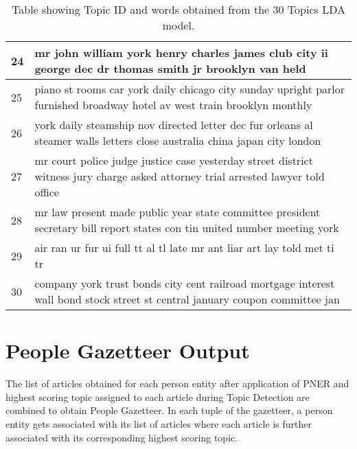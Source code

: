 \begin{table}
{\begin{tabular}{|p{1cm}|p{16cm}|}
    24       & mr john william york henry charles james club city ii george dec dr thomas smith jr brooklyn van held                                                 \\ \hline
    25       & piano st rooms car york daily chicago city sunday upright parlor furnished broadway hotel av west train brooklyn monthly                              \\ \hline
    26       & york daily steamship nov directed letter dec fur orleans al steamer walls letters close australia china japan city london                             \\ \hline
    27       & mr court police judge justice case yesterday street district witness jury charge asked attorney trial arrested lawyer told office                     \\ \hline
    28       & mr law present made public year state committee president secretary bill report states con tin united number meeting york                             \\ \hline
    29       & air ran ur fur ui full tt al tl late mr ant liar art lay told met ti tr                                                                               \\ \hline
    30       & company york trust bonds city cent railroad mortgage interest wall bond stock street st central january coupon committee jan                          \\ \hline
    \end{tabular}}
\caption{Table showing Topic ID and words obtained from the 30 Topics LDA model.}
\label{table:topicwords}
\end{table}

\newpage
\section{People Gazetteer Output }
\label{gaz:result}

The list of articles obtained for each person entity after application of PNER and highest scoring topic assigned to each article during Topic Detection are combined to obtain People Gazetteer. In each tuple of the gazetteer, a person entity gets associated with its list of articles where each article is further associated with its corresponding highest scoring topic.

